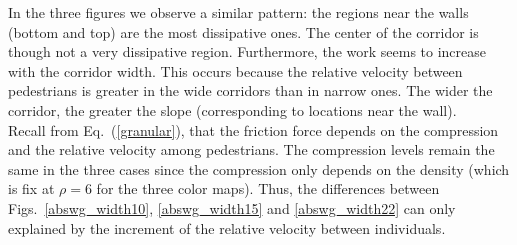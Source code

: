 \documentclass[preprint,12pt]{elsarticle}
\begin{document}
In the three figures we observe a similar pattern: the regions near the walls (bottom and top) are the most dissipative ones. The center of the corridor is though not a very dissipative region. Furthermore, the work seems to increase with the corridor width. This occurs because the relative velocity between pedestrians is greater in the wide corridors than in narrow ones. The wider the corridor, the greater the slope (corresponding to locations near the wall).\\

Recall from Eq.~(\ref{granular}), that the friction force depends on the 
compression and the relative velocity among pedestrians. The compression levels 
remain the same in the three cases since the compression only depends on the 
density (which is fix at $\rho=6$ for the three color maps). Thus, the 
differences between Figs.~\ref{abswg_width10}, \ref{abswg_width15} and 
\ref{abswg_width22} can only explained by the increment of the relative velocity 
between individuals. \\
\end{document}
